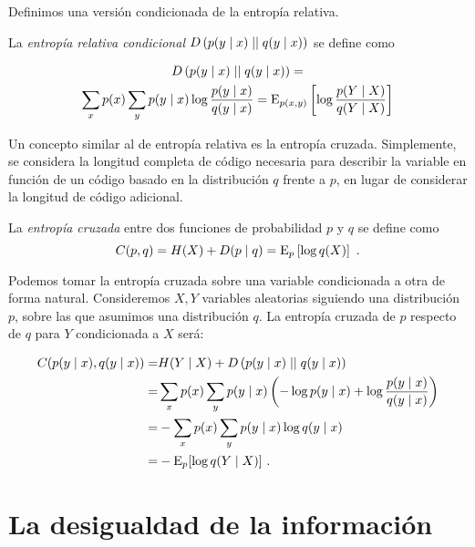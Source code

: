 \theoe

Definimos una versión condicionada de la entropía relativa.

La \emph{entropía relativa condicional}
\(D\left(p(y\mid x)\mid\mid q(y\mid x)\right)\) se define como

\begin{gather*}D\left(p(y\mid x)\mid\mid q(y\mid x)\right)=\\\sum_{x}p(x)\sum_{y}p(y\mid x)\log\frac{p(y\mid x)}{q(y\mid x)}=\mathrm{E}_{p(x,y)}\left[\log\frac{p(Y\mid X)}{q(Y\mid X)}\right]
\end{gather*}


Un concepto similar al de entropía relativa es la entropía cruzada.
Simplemente, se considera la longitud completa de código necesaria para describir la variable en función de un código basado en la distribución $q$ frente a $p$, en lugar de considerar la longitud de código adicional.

La \emph{entropía cruzada} entre dos funciones de probabilidad \(p\) y
\(q\) se define como
\[C(p, q)=H(X) + D(p\mid q)=\mathrm{E}_p\left[\log q(X)\right]~.\]


\remb
Podemos tomar la entropía cruzada sobre una variable condicionada a otra
de forma natural. Consideremos \(X,Y\) variables aleatorias siguiendo
una distribución \(p\), sobre las que asumimos una distribución \(q\).
La entropía cruzada de \(p\) respecto de \(q\) para \(Y\) condicionada a
\(X\) será:

\begin{align*}
  C(p(y\mid x),q(y \mid x))=&H(Y\mid X) + D\left(p(y\mid x)\mid\mid q(y\mid x)\right)\\
                =&\sum_{x}p(x)\sum_{y}p(y\mid x)\left(-\log p(y\mid x)
                  +\log\frac{p(y\mid x)}{q(y\mid x)}\right)\\
                =&-\sum_{x}p(x)\sum_{y}p(y\mid x)\log q(y\mid x)\\
                =&-\mathrm{E}_p[\log q(Y\mid X)]~.
\end{align*}

\reme

\section{La desigualdad de la
información}\label{la-desigualdad-de-la-informaciuxf3n}

